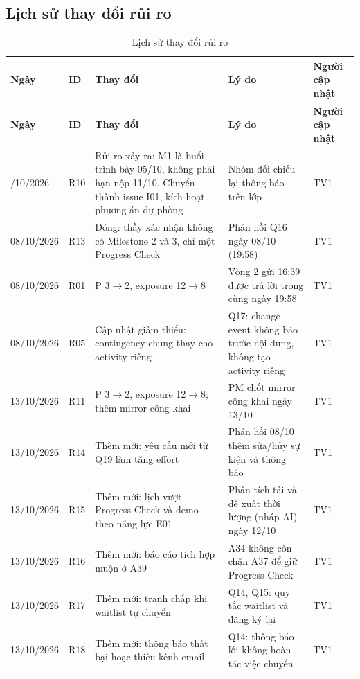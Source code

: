 \begin{landscape}
\section{Lịch sử thay đổi rủi ro}
\begingroup\tblsetup\footnotesize\renewcommand{\arraystretch}{1.1}\tblzebra
\begin{longtable}{L{2.82cm}L{1.13cm}L{7.77cm}L{6.07cm}L{2.11cm}}
\caption{Lịch sử thay đổi rủi ro}\label{tab:risk-history}\\
\toprule
{}\textbf{Ngày} & \textbf{ID} & \textbf{Thay đổi} & \textbf{Lý do} & \textbf{Người cập nhật} \\
\midrule
\endfirsthead
\toprule
{}\textbf{Ngày} & \textbf{ID} & \textbf{Thay đổi} & \textbf{Lý do} & \textbf{Người cập nhật} \\
\midrule
\endhead
\bottomrule
{}/10/2026 & R10 & Rủi ro xảy ra: M1 là buổi trình bày 05/10, không phải hạn nộp 11/10. Chuyển thành issue I01, kích hoạt phương án dự phòng & Nhóm đối chiếu lại thông báo trên lớp & TV1 \\
08/10/2026 & R13 & Đóng: thầy xác nhận không có Milestone 2 và 3, chỉ một Progress Check & Phản hồi Q16 ngày 08/10 (19:58) & TV1 \\
08/10/2026 & R01 & P 3$\rightarrow$2, exposure 12$\rightarrow$8 & Vòng 2 gửi 16:39 được trả lời trong cùng ngày 19:58 & TV1 \\
08/10/2026 & R05 & Cập nhật giảm thiểu: contingency chung thay cho activity riêng & Q17: change event không báo trước nội dung, không tạo activity riêng & TV1 \\
13/10/2026 & R11 & P 3$\rightarrow$2, exposure 12$\rightarrow$8; thêm mirror công khai & PM chốt mirror công khai ngày 13/10 & TV1 \\
13/10/2026 & R14 & Thêm mới: yêu cầu mới từ Q19 làm tăng effort & Phản hồi 08/10 thêm sửa/hủy sự kiện và thông báo & TV1 \\
13/10/2026 & R15 & Thêm mới: lịch vượt Progress Check và demo theo năng lực E01 & Phân tích tải và đề xuất thời lượng (nháp AI) ngày 12/10 & TV1 \\
13/10/2026 & R16 & Thêm mới: báo cáo tích hợp muộn ở A39 & A34 không còn chặn A37 để giữ Progress Check & TV1 \\
13/10/2026 & R17 & Thêm mới: tranh chấp khi waitlist tự chuyển & Q14, Q15: quy tắc waitlist và đăng ký lại & TV1 \\
13/10/2026 & R18 & Thêm mới: thông báo thất bại hoặc thiếu kênh email & Q14: thông báo lỗi không hoàn tác việc chuyển & TV1 \\

\end{longtable}
\end{landscape}
